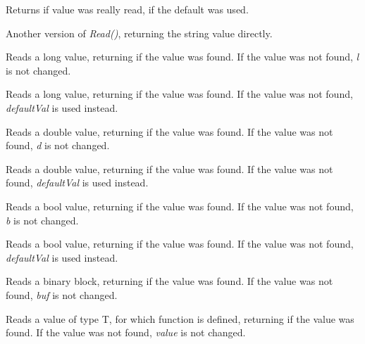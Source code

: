 Returns \true if value was really read, \false if the default was used.


Another version of {\it Read()}, returning the string value directly.


Reads a long value, returning \true if the value was found. If the value was
not found, {\it l} is not changed.


Reads a long value, returning \true if the value was found. If the value was
not found, {\it defaultVal} is used instead.


Reads a double value, returning \true if the value was found. If the value was
not found, {\it d} is not changed.


Reads a double value, returning \true if the value was found. If the value was
not found, {\it defaultVal} is used instead.


Reads a bool value, returning \true if the value was found. If the value was
not found, {\it b} is not changed.


Reads a bool value, returning \true if the value was found. If the value was
not found, {\it defaultVal} is used instead.


Reads a binary block, returning \true if the value was found. If the value was
not found, {\it buf} is not changed.


Reads a value of type T, for which function
 is defined,
returning \true if the value was found.
If the value was not found, {\it value} is not changed.


